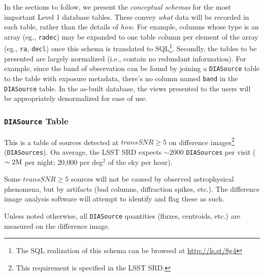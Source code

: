 \documentclass[12pt]{article}
\newcommand{\code}[1]{\texttt{#1}}
\newcommand{\DIASource}{\code{DIASource}\xspace}
\newcommand{\DIASources}{\code{DIASources}\xspace}
\newcommand{\DB}{{Level 1 database}\xspace}
\newcommand{\transSNR}{5\xspace}
\begin{document}
\vspace{2em}

In the sections to follow, we present the {\em conceptual schemas} for the most important \DB tables. These convey {\em what} data will be recorded in each table, rather than the details of {\em how}. For example, columns whose type is an array (eg., \texttt{radec}) may be expanded to one table column per element of the array (eg., \texttt{ra}, \texttt{decl}) once this schema is translated to SQL\footnote{The SQL realization of this schema can be browsed at \url{http://ls.st/8g4}}. Secondly, the tables to be presented are largely normalized (i.e., contain no redundant information). For example, since the band of observation can be found by joining a \DIASource table to the table with exposure metadata, there's no column named {\tt band} in the \DIASource table. In the as-built database, the views presented to the users will be appropriately denormalized for ease of use.

\subsubsection{\DIASource Table}

This is a table of sources detected at $transSNR \geq \transSNR$ on difference images\footnote{This requirement is specified in the LSST SRD.} (\DIASources). On average, the LSST SRD expects $\sim 2000$ \DIASources per visit ($\sim 2{\rm M}$ per night; 20,000 per deg$^2$ of the sky per hour).

Some $transSNR \geq \transSNR$ sources will not be caused by observed astrophysical phenomena, but by artifacts (bad columns, diffraction spikes, etc.). The difference image analysis software will attempt to identify and flag these as such.

Unless noted otherwise, all \DIASource quantities (fluxes, centroids, etc.) are measured on the difference image.
\end{document}
